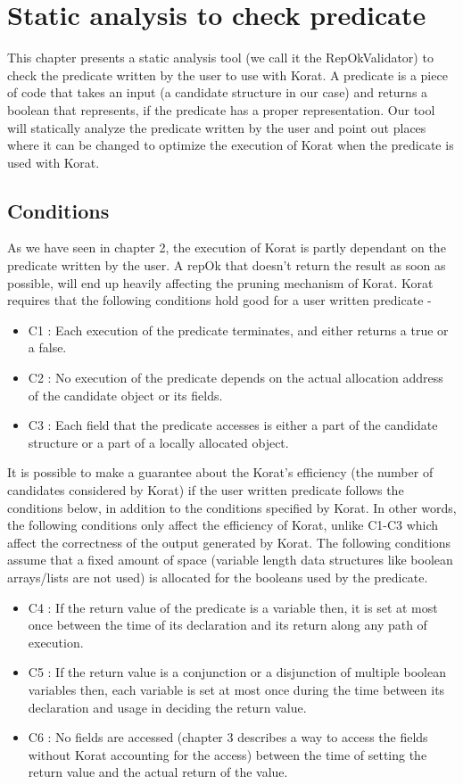 \chapter{Static analysis to check predicate}
This chapter presents a static analysis tool (we call it the RepOkValidator) to check the predicate written by the user to use with Korat. A predicate is a piece of code that takes an input (a candidate structure in our case) and returns a boolean that represents, if the predicate has a proper representation. Our tool will statically analyze the predicate written by the user and point out places where it can be changed to optimize the execution of Korat when the predicate is used with Korat.

\section{Conditions}
As we have seen in chapter 2, the execution of Korat is partly dependant on the predicate written by the user. A repOk that doesn’t return the result as soon as possible, will end up heavily affecting the pruning mechanism of Korat. Korat requires that the following conditions hold good for a user written predicate - 
\begin{itemize}
\item C1 : Each execution of the predicate terminates, and either returns a true or a false.
\item C2 : No execution of the predicate depends on the actual allocation address of the candidate object or its fields.
\item C3 : Each field that the predicate accesses is either a part of the candidate structure or a part of a locally allocated object.
\end{itemize}

\par
It is possible to make a guarantee about the Korat’s efficiency (the number of candidates considered by Korat) if the user written predicate follows the conditions below, in addition to the conditions specified by Korat. In other words, the following conditions only affect the efficiency of Korat, unlike C1-C3 which affect the correctness of the output generated by Korat. The following conditions assume that a fixed amount of space (variable length data structures like boolean arrays/lists are not used) is allocated for the booleans used by the predicate. 
\begin{itemize}
\item C4 : If the return value of the predicate is a variable then, it is set at most once between the time of its declaration and its return along any path of execution.
\item C5 : If the return value is a conjunction or a disjunction of multiple boolean variables then, each variable is set at most once during the time between its declaration and usage in deciding the return value.
\item C6 : No fields are accessed (chapter 3 describes a way to access the fields without Korat accounting for the access) between the time of setting the return value and the actual return of the value.
\end{itemize}

